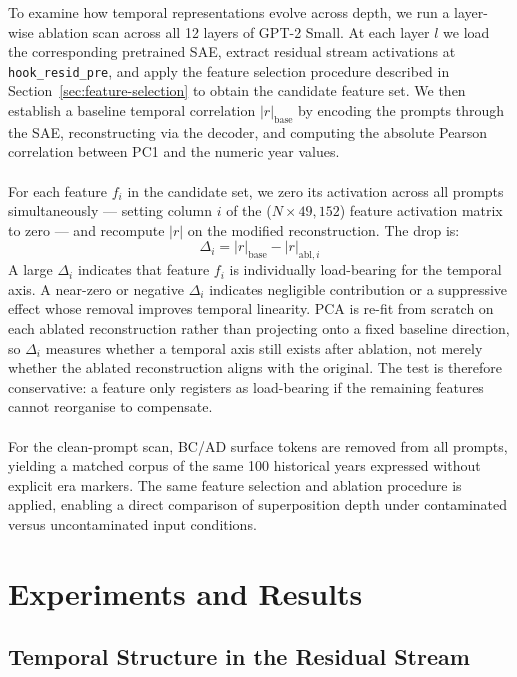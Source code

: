 \documentclass[11pt]{article}
\begin{document}
To examine how temporal representations evolve across depth, we run a layer-wise ablation scan across all 12 layers of GPT-2 Small. At each
layer $l$ we load the corresponding pretrained SAE, extract residual stream activations at \texttt{hook\_resid\_pre}, and apply the feature selection
procedure described in Section~\ref{sec:feature-selection} to obtain the candidate feature set. We then establish a baseline temporal correlation
$|r|_{\text{base}}$ by encoding the prompts through the SAE, reconstructing via the decoder, and computing the absolute Pearson correlation between
PC1 and the numeric year values.
\\
\\
For each feature $f_i$ in the candidate set, we zero its activation across all prompts simultaneously --- setting column $i$ of the
($N \times 49{,}152$) feature activation matrix to zero --- and recompute $|r|$ on the modified reconstruction. The drop is:
$$\Delta_i = \lvert r \rvert_{\text{base}} - \lvert r \rvert_{\text{abl}, i}$$
A large $\Delta_i$ indicates that feature $f_i$ is individually load-bearing for the temporal axis. A near-zero or negative $\Delta_i$ indicates
negligible contribution or a suppressive effect whose removal improves temporal linearity. PCA is re-fit from scratch on each ablated reconstruction
rather than projecting onto a fixed baseline direction, so $\Delta_i$ measures whether a temporal axis still exists after ablation, not merely
whether the ablated reconstruction aligns with the original. The test is therefore conservative: a feature only registers as load-bearing if the
remaining features cannot reorganise to compensate.
\\
\\
For the clean-prompt scan, BC/AD surface tokens are removed from all prompts, yielding a matched corpus of the same 100 historical years
expressed without explicit era markers. The same feature selection and ablation procedure is applied, enabling a direct comparison of superposition
depth under contaminated versus uncontaminated input conditions.


\section{Experiments and Results}

\subsection{Temporal Structure in the Residual Stream}
\end{document}
